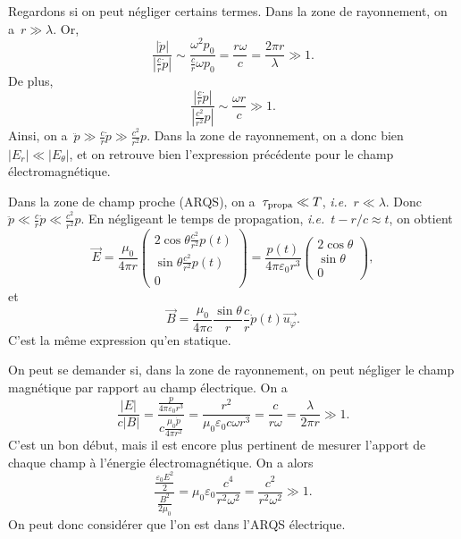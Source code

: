 Regardons si on peut négliger certains termes. Dans la zone de rayonnement, on a~$r\gg\lambda$. Or,
\begin{equation*}
    \frac{\left\lvert\ddot{p}\right\rvert}{\left\lvert\frac{c}{r}\dot{p}\right\rvert}\sim\frac{\omega^{2}p_0}{\frac{c}{r}\omega p_0}=\frac{r\omega}{c}=\frac{2\pi r}{\lambda}\gg1.
\end{equation*}
De plus,
\begin{equation*}
    \frac{
        \left\lvert\frac{c}{r}\dot{p}\right\rvert
    }{
        \left\lvert\frac{c^{2}}{r^{2}}p\right\rvert
    }\sim\frac{\omega r}{c}\gg1.
\end{equation*}
Ainsi, on a~$\ddot{p}\gg\frac{c}{r}\dot{p}\gg\frac{c^{2}}{r^{2}}p$. Dans la zone de rayonnement, on a donc bien~$\left\lvert E_r\right\rvert\ll\left\lvert E_{\theta}\right\rvert$, et on retrouve bien l'expression précédente pour le champ électromagnétique.

\begin{remark}
    Dans la zone de champ proche (ARQS), on a~$\tau_{\rm propa}\ll T$, \emph{i.e.}~$r\ll\lambda$. Donc~$\ddot{p}\ll\frac{c}{r}\dot{p}\ll\frac{c^{2}}{r^{2}}p$. En négligeant le temps de propagation, \emph{i.e.}~$t-r/c\approx t$, on obtient
    \begin{equation*}
        \vec{E}=\frac{\mu_0}{4\pi r}\begin{pmatrix}
            2\cos\theta\frac{c^{2}}{r^{2}}p(t)\\
            \sin\theta\frac{c^{2}}{r^{2}}p(t)\\
            0
        \end{pmatrix}=\frac{p(t)}{4\pi\varepsilon_0 r^{3}}\begin{pmatrix}
            2\cos\theta\\\sin\theta\\0
        \end{pmatrix},
    \end{equation*}
    et
    \begin{equation*}
        \vec{B}=\frac{\mu_0}{4\pi c}\frac{\sin\theta}{r}\frac{c}{r}\dot{p}(t)\vec{u_{\varphi}}.
    \end{equation*}
    C'est la même expression qu'en statique.
\end{remark}

On peut se demander si, dans la zone de rayonnement, on peut négliger le champ magnétique par rapport au champ électrique. On a 
\begin{equation*}
    \frac{\left\lvert E\right\rvert}{c\left\lvert B\right\rvert}=
    \frac{
        \frac{p}{4\pi\varepsilon_0 r^{3}}
    }{
        c\frac{\mu_0\dot{p}}{4\pi r^{2}}
    }=\frac{r^{2}}{\mu_0\varepsilon_0 c\omega r^{3}}=\frac{c}{r\omega}=\frac{\lambda}{2\pi r}\gg 1.
\end{equation*}
C'est un bon début, mais il est encore plus pertinent de mesurer l'apport de chaque champ à l'énergie électromagnétique. On a alors
\begin{equation*}
    \frac{
        \frac{\varepsilon_0 E^{2}}{2}
    }{
        \frac{B^{2}}{2\mu_0}
    }=\mu_0\varepsilon_0\frac{c^{4}}{r^{2}\omega^{2}}=\frac{c^{2}}{r^{2}\omega^{2}}\gg1.
\end{equation*}
On peut donc considérer que l'on est dans l'ARQS électrique.


